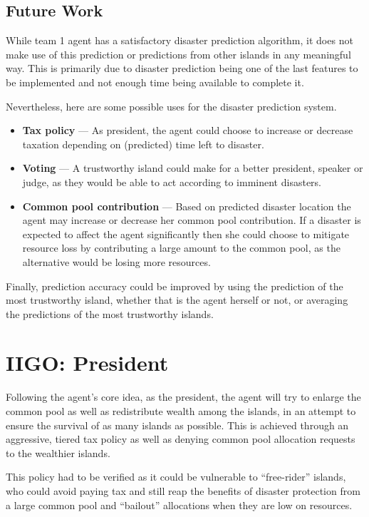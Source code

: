 \subsection{Future Work}
While team 1 agent has a satisfactory disaster prediction algorithm, it does not make use of this prediction or predictions from other islands in any meaningful way. This is primarily due to disaster prediction being one of the last features to be implemented and not enough time being available to complete it.

Nevertheless, here are some possible uses for the disaster prediction system.

\begin{itemize}
  \item \textbf{Tax policy} --- As president, the agent could choose to increase or decrease taxation depending on (predicted) time left to disaster.
  \item \textbf{Voting} --- A trustworthy island could make for a better president, speaker or judge, as they would be able to act according to imminent disasters.
  \item \textbf{Common pool contribution} --- Based on predicted disaster location the agent may increase or decrease her common pool contribution. If a disaster is expected to affect the agent significantly then she could choose to mitigate resource loss by contributing a large amount to the common pool, as the alternative would be losing more resources.
\end{itemize}

Finally, prediction accuracy could be improved by using the prediction of the most trustworthy island, whether that is the agent herself or not, or averaging the predictions of the most trustworthy islands.

\section{IIGO: President}

Following the agent's core idea, as the president, the agent will try to enlarge the common pool as well as redistribute wealth among the islands, in an attempt to ensure the survival of as many islands as possible. This is achieved through an aggressive, tiered tax policy as well as denying common pool allocation requests to the wealthier islands.

This policy had to be verified as it could be vulnerable to ``free-rider'' islands, who could avoid paying tax and still reap the benefits of disaster protection from a large common pool and ``bailout'' allocations when they are low on resources.

